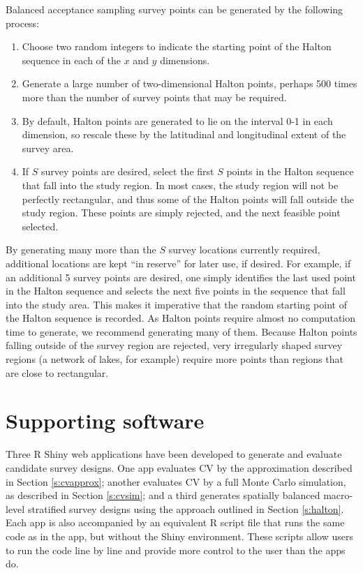 \documentclass[a4paper,11pt]{article} %
\begin{document}
Balanced acceptance sampling survey points can be generated by the following process:
\begin{enumerate}
\item Choose two random integers to indicate the starting point of the Halton sequence in each of the $x$ and $y$ dimensions.
\item Generate a large number of two-dimensional Halton points, perhaps 500 times more than the number of survey points that may be required.
\item By default, Halton points are generated to lie on the interval 0-1 in each dimension, so rescale these by the latitudinal and longitudinal extent of the survey area. 
\item If $S$ survey points are desired, select the first $S$ points in the Halton sequence that fall into the study region. In most cases, the study region will not be perfectly rectangular, and thus some of the Halton points will fall outside the study region. These points are simply rejected, and the next feasible point selected.
\end{enumerate}

By generating many more than the $S$ survey locations currently required, additional locations are kept ``in reserve'' for later use, if desired. For example, if an additional 5 survey points are desired, one simply identifies the last used point in the Halton sequence and selects the next five points in the sequence that fall into the study area. This makes it imperative that the random starting point of the Halton sequence is recorded. As Halton points require almost no computation time to generate, we recommend generating many of them. Because Halton points falling outside of the survey region are rejected, very irregularly shaped survey regions (a network of lakes, for example) require more points than regions that are close to rectangular.

\section{Supporting software}

Three R Shiny web applications have been developed to generate and evaluate candidate survey designs. One app evaluates CV by the approximation described in Section \ref{s:cvapprox}; another evaluates CV by a full Monte Carlo simulation, as described in Section \ref{s:cvsim}; and a third generates spatially balanced macro-level stratified survey designs using the approach outlined in Section \ref{s:halton}. Each app is also accompanied by an equivalent R script file that runs the same code as in the app, but without the Shiny environment. These scripts allow users to run the code line by line and provide more control to the user than the apps do. 
\end{document}
